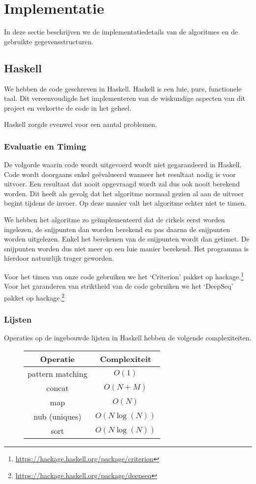 \newpage
\section{Implementatie}
\label{sec:implementation}
In deze sectie beschrijven we de implementatiedetails van de algoritmes en de gebruikte gegevensstructuren.

\subsection{Haskell}
We hebben de code geschreven in Haskell. Haskell is een luie, pure,  functionele taal. Dit vereenvoudigde het implementeren van de wiskundige aspecten van dit project en verkortte de code in het geheel.

Haskell zorgde evenwel voor een aantal problemen.

\subsubsection{Evaluatie en Timing}
De volgorde waarin code wordt uitgevoerd wordt niet gegarandeerd in Haskell.
Code wordt doorgaans enkel ge\"evalueerd wanneer het resultaat nodig is voor uitvoer.
Een resultaat dat nooit opgevraagd wordt zal dus ook nooit berekend worden.
Dit heeft als gevolg dat het algoritme normaal gezien al aan de uitvoer begint tijdens de invoer.
Op deze manier valt het algoritme echter niet te timen.

We hebben het algoritme zo ge\"implementeerd dat de cirkels eerst worden ingelezen, de snijpunten dan worden berekend en pas daarna de snijpunten worden uitgelezen. Enkel het berekenen van de snijpunten wordt dan getimet. De snijpunten worden dus niet meer op een luie manier berekend. Het programma is hierdoor natuurlijk trager geworden.

Voor het timen van onze code gebruiken we het `Criterion' pakket op hackage.\footnote{\url{https://hackage.haskell.org/package/criterion}}
Voor het garanderen van striktheid van de code gebruiken we het `DeepSeq' pakket op hackage.\footnote{\url{https://hackage.haskell.org/package/deepseq}}

\subsubsection{Lijsten}
Operaties op de ingebouwde lijsten in Haskell hebben de volgende complexiteiten.
\begin{figure}[H]
\centering
\begin{tabular}{|c|c|}
\hline
Operatie & Complexiteit\\
\hline\hline
pattern matching & $O(1)$\\\hline
concat & $O(N+M)$\\\hline
map & $O(N)$\\\hline
nub (uniques) & $O(N\log(N))$\\\hline
sort & $O(N\log(N))$\\\hline
\end{tabular}
\end{figure}

